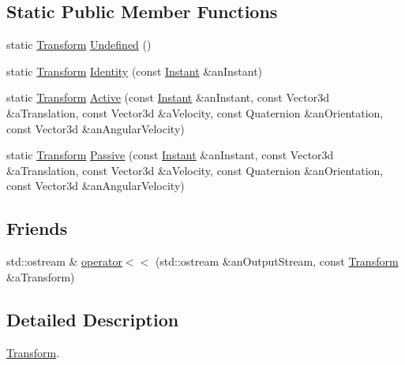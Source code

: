 \subsection*{Static Public Member Functions}
\begin{DoxyCompactItemize}
\item 
static \hyperlink{classostk_1_1physics_1_1coord_1_1_transform}{Transform} \hyperlink{classostk_1_1physics_1_1coord_1_1_transform_a1271dd5a8f524e69b529538ca1871da7}{Undefined} ()
\item 
static \hyperlink{classostk_1_1physics_1_1coord_1_1_transform}{Transform} \hyperlink{classostk_1_1physics_1_1coord_1_1_transform_ab28461486f64cabd004ba99fc4c4b105}{Identity} (const \hyperlink{classostk_1_1physics_1_1time_1_1_instant}{Instant} \&an\+Instant)
\item 
static \hyperlink{classostk_1_1physics_1_1coord_1_1_transform}{Transform} \hyperlink{classostk_1_1physics_1_1coord_1_1_transform_a0e28392ffaf90f9a3a75bef3f0d612d3}{Active} (const \hyperlink{classostk_1_1physics_1_1time_1_1_instant}{Instant} \&an\+Instant, const Vector3d \&a\+Translation, const Vector3d \&a\+Velocity, const Quaternion \&an\+Orientation, const Vector3d \&an\+Angular\+Velocity)
\item 
static \hyperlink{classostk_1_1physics_1_1coord_1_1_transform}{Transform} \hyperlink{classostk_1_1physics_1_1coord_1_1_transform_af8df2e5e9b476720bee05301079eb908}{Passive} (const \hyperlink{classostk_1_1physics_1_1time_1_1_instant}{Instant} \&an\+Instant, const Vector3d \&a\+Translation, const Vector3d \&a\+Velocity, const Quaternion \&an\+Orientation, const Vector3d \&an\+Angular\+Velocity)
\end{DoxyCompactItemize}
\subsection*{Friends}
\begin{DoxyCompactItemize}
\item 
std\+::ostream \& \hyperlink{classostk_1_1physics_1_1coord_1_1_transform_ae46ab7a297c23b757fd6f41bf30c4054}{operator$<$$<$} (std\+::ostream \&an\+Output\+Stream, const \hyperlink{classostk_1_1physics_1_1coord_1_1_transform}{Transform} \&a\+Transform)
\end{DoxyCompactItemize}


\subsection{Detailed Description}
\hyperlink{classostk_1_1physics_1_1coord_1_1_transform}{Transform}. 

